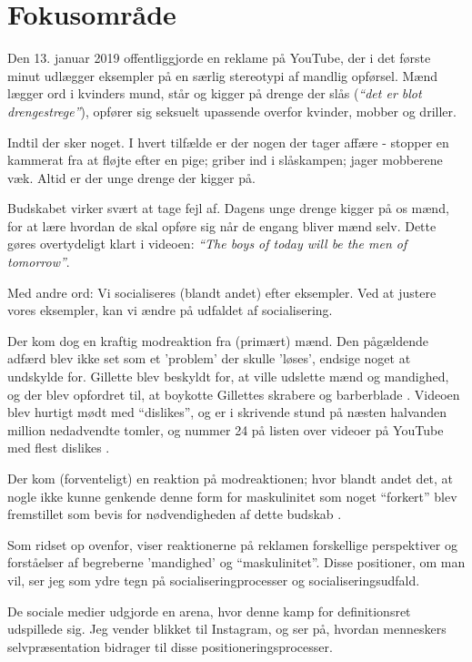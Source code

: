 \section{Fokusområde}

Den 13. januar 2019 offentliggjorde  
\citeauthor{gilletteWeBelieveBest2019} en reklame på YouTube, der
i det første minut udlægger eksempler på en særlig stereotypi af
mandlig opførsel. Mænd lægger ord i kvinders mund, står og kigger
på drenge der slås (\textit{“det er blot drengestrege”}), opfører 
sig seksuelt upassende overfor kvinder, mobber og driller.

Indtil der sker noget. I hvert tilfælde er der nogen der tager
affære - stopper en kammerat fra at fløjte efter en pige; griber
ind i slåskampen; jager mobberene væk. Altid er der unge drenge
der kigger på.

Budskabet virker svært at tage fejl af. Dagens unge drenge kigger
på os mænd, for at lære hvordan de skal opføre sig når de engang
bliver mænd selv. Dette gøres overtydeligt klart i videoen: 
\textit{“The boys of today will be the men of tomorrow”}.

Med andre ord: Vi socialiseres (blandt andet) efter eksempler. Ved
at justere vores eksempler, kan vi ændre på udfaldet af
socialisering.

Der kom dog en kraftig modreaktion fra (primært) mænd.
Den pågældende adfærd blev ikke set som et 'problem' der skulle
'løses', endsige noget at undskylde for. Gillette blev
beskyldt for, at ville udslette mænd og mandighed, og der blev
opfordret til, at boykotte Gillettes skrabere og barberblade 
\autocite{nashGilletteFacesWidespread2019}. Videoen blev hurtigt 
mødt med “dislikes”, og er i skrivende stund på næsten halvanden 
million nedadvendte tomler, og nummer 24 på listen over videoer på 
YouTube med flest dislikes 
\autocite{wikipediaListMostdislikedYouTube2019}.

Der kom (forventeligt) en reaktion på modreaktionen; hvor blandt 
andet det, at nogle ikke kunne genkende denne form for 
maskulinitet som noget “forkert” blev fremstillet som bevis for
nødvendigheden af dette budskab 
\autocite{mutherBacklashGilletteAd2019}. 

Som ridset op ovenfor, viser reaktionerne på reklamen forskellige
perspektiver og forståelser af begreberne 'mandighed' og
“maskulinitet”. Disse positioner, om man vil, ser jeg som ydre
tegn på socialiseringprocesser og socialiseringsudfald. 

De sociale medier udgjorde en arena, hvor denne kamp for 
definitionsret udspillede sig. Jeg vender blikket til Instagram, 
og ser på, hvordan menneskers selvpræsentation bidrager til disse 
positioneringsprocesser.

